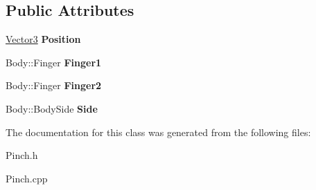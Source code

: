 \subsection*{Public Attributes}
\begin{DoxyCompactItemize}
\item 
\hyperlink{class_efficio_1_1_vector3}{Vector3} {\bfseries Position}\hypertarget{class_efficio_1_1_input_recognition_1_1_human_1_1_hands_1_1_pinch_aef25b5e89e91b9e9a7886a087c1b019f}{}\label{class_efficio_1_1_input_recognition_1_1_human_1_1_hands_1_1_pinch_aef25b5e89e91b9e9a7886a087c1b019f}

\item 
Body\+::\+Finger {\bfseries Finger1}\hypertarget{class_efficio_1_1_input_recognition_1_1_human_1_1_hands_1_1_pinch_ad8c959f5692cdf6e62381296c9d895fc}{}\label{class_efficio_1_1_input_recognition_1_1_human_1_1_hands_1_1_pinch_ad8c959f5692cdf6e62381296c9d895fc}

\item 
Body\+::\+Finger {\bfseries Finger2}\hypertarget{class_efficio_1_1_input_recognition_1_1_human_1_1_hands_1_1_pinch_a54b57c5b8ac5818d94a37fe52a5c2633}{}\label{class_efficio_1_1_input_recognition_1_1_human_1_1_hands_1_1_pinch_a54b57c5b8ac5818d94a37fe52a5c2633}

\item 
Body\+::\+Body\+Side {\bfseries Side}\hypertarget{class_efficio_1_1_input_recognition_1_1_human_1_1_hands_1_1_pinch_afacf4440ba63d00e52e205b0710798d1}{}\label{class_efficio_1_1_input_recognition_1_1_human_1_1_hands_1_1_pinch_afacf4440ba63d00e52e205b0710798d1}

\end{DoxyCompactItemize}


The documentation for this class was generated from the following files\+:\begin{DoxyCompactItemize}
\item 
Pinch.\+h\item 
Pinch.\+cpp\end{DoxyCompactItemize}
